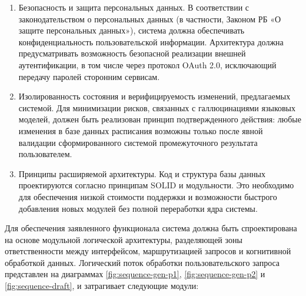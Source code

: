 \begin{enumerate}[label=\arabic*]
    
    \item Безопасность и защита персональных данных. В соответствии с законодательством о персональных данных (в частности, Законом РБ «О защите персональных данных»), система должна обеспечивать конфиденциальность пользовательской информации. Архитектура должна предусматривать возможность безопасной реализации внешней аутентификации, в том числе через протокол OAuth 2.0, исключающий передачу паролей сторонним сервисам.
    
    \item Изолированность состояния и верифицируемость изменений, предлагаемых системой. Для минимизации рисков, связанных с галлюцинациями языковых моделей, должен быть реализован принцип подтвержденного действия: любые изменения в базе данных расписания возможны только после явной валидации сформированного системой промежуточного результата пользователем.
    
    \item Принципы расширяемой архитектуры. Код и структура базы данных проектируются согласно принципам SOLID и модульности. Это необходимо для обеспечения низкой стоимости поддержки и возможности быстрого добавления новых модулей без полной переработки ядра системы.
\end{enumerate}



\numberedparagraph
Для обеспечения заявленного функционала система должна быть спроектирована на основе модульной логической архитектуры, разделяющей зоны ответственности между интерфейсом, маршрутизацией запросов и когнитивной обработкой данных.
Логический поток обработки пользовательского запроса представлен на диаграммах \ref{fig:sequence-gen-p1}, \ref{fig:sequence-gen-p2} и \ref{fig:sequence-draft}, и затрагивает следующие модули:

